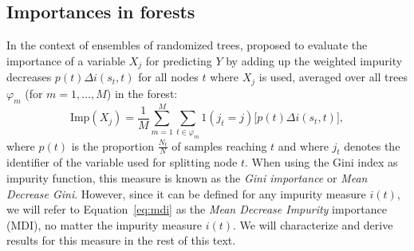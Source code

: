 \subsection{Importances in forests}

In the context of ensembles of randomized trees,
\cite{breiman:2001,breiman:2002} proposed to evaluate the importance of
a variable $X_j$  for predicting  $Y$ by adding up the weighted impurity decreases $p(t) \Delta
i(s_t, t)$ for all nodes $t$ where $X_j$ is used, averaged over all trees $\varphi_m$ (for $m=1,\dots,M$)
in the forest:
\begin{equation}\label{eq:mdi}
\text{Imp}(X_j) = \frac{1}{M} \sum_{m=1}^M \sum_{t \in \varphi_{m}} 1(j_t = j) \Big[ p(t) \Delta i(s_t, t) \Big],
\end{equation}
where $p(t)$ is the proportion $\tfrac{N_t}{N}$ of samples
reaching $t$ and where $j_t$ denotes the identifier of the variable used for splitting node $t$. When
using the Gini index as impurity function, this measure is known as the
\textit{Gini importance} or \textit{Mean Decrease Gini}. However, since it can
be defined for any impurity measure $i(t)$, we will refer to Equation~\ref{eq:mdi}
as the \textit{Mean Decrease Impurity} importance (MDI), no matter the impurity
measure $i(t)$. We will characterize and derive results for this measure in the
rest of this text.

